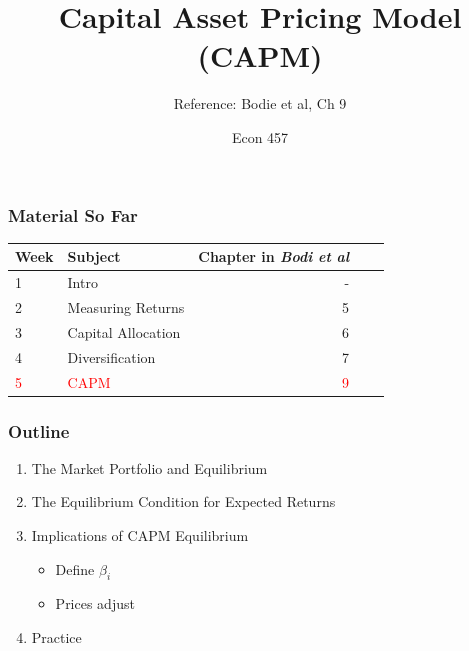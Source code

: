 \documentclass{beamer}
\title{Capital Asset Pricing Model (CAPM)}
\subtitle{Reference: Bodie et al, Ch 9}
\author{Econ 457}
\date{\week}
\begin{document}
\frame{\titlepage}

\begin{frame}
    \frametitle{Material So Far}

    \begin{table}
        \begin{tabular}{llrrr}
        \toprule
         Week & Subject & Chapter in \textit{Bodi et al} \\
        \midrule
        1 & Intro  &  - \\
        2 & Measuring Returns & 5 \\
        3 & Capital Allocation & 6 \\
        4 & Diversification & 7 \\
        \textcolor{red}{5} & \textcolor{red}{CAPM} & \textcolor{red}{9} \\
        \bottomrule
        \end{tabular}
    \end{table}

\end{frame}

\begin{frame}
    \frametitle{Outline}

    \begin{enumerate}
        \item The Market Portfolio and Equilibrium
        \item The Equilibrium Condition for Expected Returns
        \item Implications of CAPM Equilibrium
        \begin{itemize}
            \item Define $\beta_i$
            \item Prices adjust
        \end{itemize}
        \item Practice
    \end{enumerate}
\end{frame}
\end{document}
